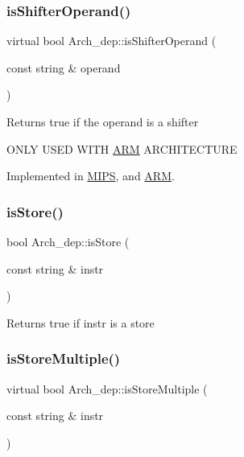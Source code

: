 \subsubsection{\texorpdfstring{is\+Shifter\+Operand()}{isShifterOperand()}}
{\footnotesize\ttfamily virtual bool Arch\+\_\+dep\+::is\+Shifter\+Operand (\begin{DoxyParamCaption}\item[{const string \&}]{operand }\end{DoxyParamCaption})\hspace{0.3cm}{\ttfamily [pure virtual]}}

Returns true if the operand is a shifter

O\+N\+LY U\+S\+ED W\+I\+TH \hyperlink{classARM}{A\+RM} A\+R\+C\+H\+I\+T\+E\+C\+T\+U\+RE 

Implemented in \hyperlink{classMIPS_a9390579a78d85c1024dcde783bff27b7}{M\+I\+PS}, and \hyperlink{classARM_a1dae5cec5d67a1ebb5cfaf4c0c5a0936}{A\+RM}.

\mbox{\label{classArch__dep_afff6d978b8e317027e9b6c97818fc6ab}} 
\subsubsection{\texorpdfstring{is\+Store()}{isStore()}}
{\footnotesize\ttfamily bool Arch\+\_\+dep\+::is\+Store (\begin{DoxyParamCaption}\item[{const string \&}]{instr }\end{DoxyParamCaption})}

Returns true if instr is a store \mbox{\label{classArch__dep_a54438a476a16d55659124aea0c38397a}} 
\subsubsection{\texorpdfstring{is\+Store\+Multiple()}{isStoreMultiple()}}
{\footnotesize\ttfamily virtual bool Arch\+\_\+dep\+::is\+Store\+Multiple (\begin{DoxyParamCaption}\item[{const string \&}]{instr }\end{DoxyParamCaption})\hspace{0.3cm}{\ttfamily [pure virtual]}}

